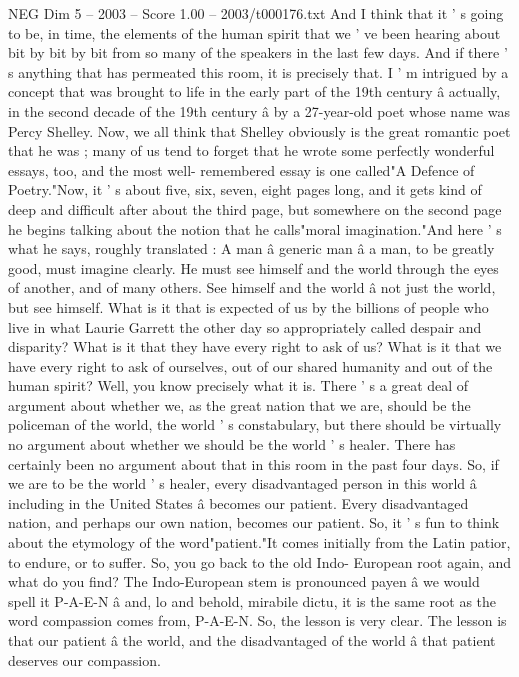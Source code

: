 \begin{textsample}{NEG Dim 5 – 2003 – Score 1.00 – 2003/t000176.txt}
And I think that it ' s going to be, in time, the elements of the human spirit that we ' ve been hearing about bit by bit by bit from so many of the speakers in the last few days.
And if there ' s anything that has permeated this room, it is precisely that.
I ' m intrigued by a concept that was brought to life in the early part of the 19th century â actually, in the second decade of the 19th century â by a 27-year-old poet whose name was Percy Shelley.
Now, we all think that Shelley obviously is the great romantic poet that he was ; many of us tend to forget that he wrote some perfectly wonderful essays, too, and the most well- remembered essay is one called"A Defence of Poetry."Now, it ' s about five, six, seven, eight pages long, and it gets kind of deep and difficult after about the third page, but somewhere on the second page he begins talking about the notion that he calls"moral imagination."And here ' s what he says, roughly translated : A man â generic man â a man, to be greatly good, must imagine clearly.
He must see himself and the world through the eyes of another, and of many others.
See himself and the world â not just the world, but see himself.
What is it that is expected of us by the billions of people who live in what Laurie Garrett the other day so appropriately called despair and disparity?
What is it that they have every right to ask of us?
What is it that we have every right to ask of ourselves, out of our shared humanity and out of the human spirit?
Well, you know precisely what it is.
There ' s a great deal of argument about whether we, as the great nation that we are, should be the policeman of the world, the world ' s constabulary, but there should be virtually no argument about whether we should be the world ' s healer.
There has certainly been no argument about that in this room in the past four days.
So, if we are to be the world ' s healer, every disadvantaged person in this world â including in the United States â becomes our patient.
Every disadvantaged nation, and perhaps our own nation, becomes our patient.
So, it ' s fun to think about the etymology of the word"patient."It comes initially from the Latin patior, to endure, or to suffer.
So, you go back to the old Indo- European root again, and what do you find?
The Indo-European stem is pronounced payen â we would spell it P-A-E-N â and, lo and behold, mirabile dictu, it is the same root as the word compassion comes from, P-A-E-N.
So, the lesson is very clear.
The lesson is that our patient â the world, and the disadvantaged of the world â that patient deserves our compassion.

\end{textsample}
